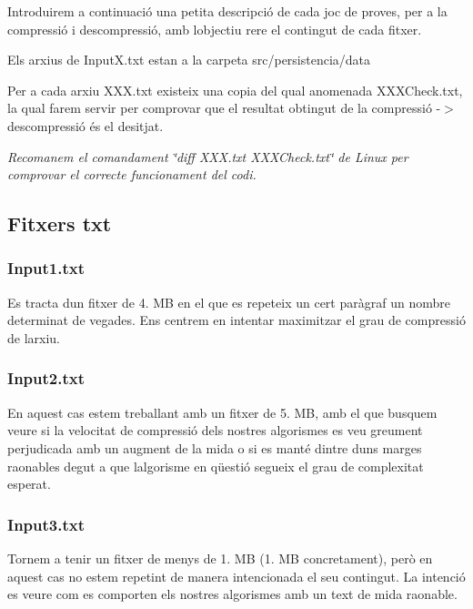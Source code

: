 Introduirem a continuació una petita descripció de cada joc de proves, per a la compressió i descompressió, amb l\textquotesingle{}objectiu rere el contingut de cada fitxer.

Els arxius de Input\+X.\+txt estan a la carpeta src/persistencia/data

Per a cada arxiu X\+X\+X.\+txt existeix una copia del qual anomenada X\+X\+X\+Check.\+txt, la qual farem servir per comprovar que el resultat obtingut de la compressió -\/$>$ descompressió és el desitjat.

{\itshape Recomanem el comandament \char`\"{}diff X\+X\+X.\+txt X\+X\+X\+Check.\+txt\char`\"{} de Linux per comprovar el correcte funcionament del codi.}

\subsection*{Fitxers txt}

\subsubsection*{Input1.\+txt}

Es tracta d\textquotesingle{}un fitxer de 4. MB en el que es repeteix un cert paràgraf un nombre determinat de vegades. Ens centrem en intentar maximitzar el grau de compressió de l\textquotesingle{}arxiu.

\subsubsection*{Input2.\+txt}

En aquest cas estem treballant amb un fitxer de 5. MB, amb el que busquem veure si la velocitat de compressió dels nostres algorismes es veu greument perjudicada amb un augment de la mida o si es manté dintre d\textquotesingle{}uns marges raonables degut a que l\textquotesingle{}algorisme en qüestió segueix el grau de complexitat esperat.

\subsubsection*{Input3.\+txt}

Tornem a tenir un fitxer de menys de 1. MB (1. MB concretament), però en aquest cas no estem repetint de manera intencionada el seu contingut. La intenció es veure com es comporten els nostres algorismes amb un text de mida raonable.


